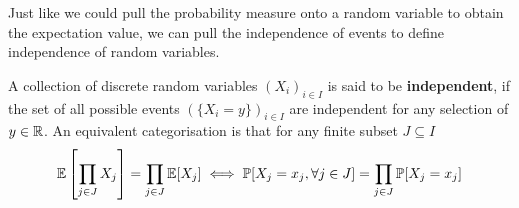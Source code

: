 Just like we could pull the probability measure onto a random variable to obtain the expectation value, we can pull the independence of events to define independence of random variables.

\begin{dfn}\label{dfn:rvind}
  A collection of discrete random variables $(X_i)_{i \in I}$ is said to be \textbf{independent}, if the set of all possible events $\left(\{X_i = y\}\right)_{i \in I}$ are independent for any selection of $y \in \mathbb{R}$. 
  An equivalent categorisation is that for any finite subset $J \subseteq I$
  \begin{align*}
    \mathbb{E}\left[\prod_{j \in J}X_j\right] = \prod_{j \in J}\mathbb{E}[X_j] \iff \mathbb{P}[X_j = x_j, \forall j \in J] = \prod_{j \in J}\mathbb{P}[X_j = x_j]
  \end{align*}
\end{dfn}

